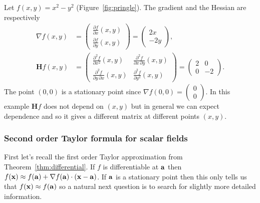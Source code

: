 \begin{example*}
    Let \(f(x,y)=x^2-y^2\) (Figure~\ref{fig:pringle}).
    The gradient and the Hessian are respectively
    \[
        \begin{aligned}
            \nabla f(x,y)      & =\begin{pmatrix}
                \frac{\partial f}{\partial x} (x,y) \\[2pt]
                \frac{\partial f}{\partial y} (x,y)
            \end{pmatrix} =   \begin{pmatrix}
                2x \\-2y
            \end{pmatrix}, \\
            \mathbf{H} f (x,y) & = \begin{pmatrix}
                \frac{\partial^2 f}{\partial x^2} (x,y)
                 & \frac{\partial^2 f}{\partial x\,\partial y} (x,y)
                \\[2pt]
                \frac{\partial^2 f}{\partial y\,\partial x} (x,y)
                 & \frac{\partial^2 f}{\partial y^2}(x,y)
            \end{pmatrix}
            = \begin{pmatrix}
                2
                 & 0
                \\[2.2ex]
                0
                 & -2
            \end{pmatrix}.
        \end{aligned}
    \]
    The point \((0,0)\) is a stationary point since \(\nabla f(0,0) =\left(\begin{smallmatrix}
            0\\0
        \end{smallmatrix}\right) \).
    In this example \(\mathbf{H} f \) does not depend on \((x,y)\) but in general we can expect dependence and so it gives a different matrix at different points  \((x,y)\).
\end{example*}


\subsubsection*{Second order Taylor formula for scalar fields}

First let's recall the first order Taylor approximation from Theorem~\ref{thm:differential}.
If \(f\) is differentiable at \(\aa\)
then
\(  f(\xx) \approx f(\aa)  + \nabla f(\aa) \cdot (\xx-\aa)\).
If \(\aa\) is a stationary point then this only tells us that \(  f(\xx) \approx f(\aa) \) so a natural next question is to search for slightly more detailed information.

